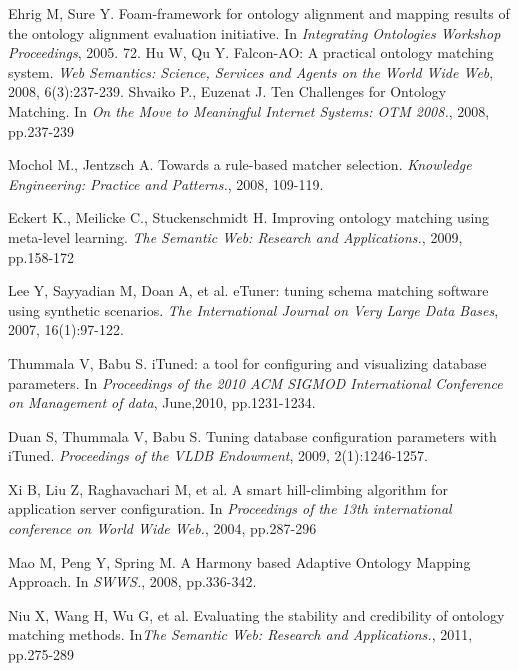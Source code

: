 \documentclass[twoside]{article}
\begin{document}
\begin{thebibliography}{99}
 Ehrig M, Sure Y. Foam-framework for ontology alignment and mapping results of the ontology alignment evaluation initiative. In {\it Integrating Ontologies Workshop Proceedings}, 2005. 72.
 Hu W, Qu Y. Falcon-AO: A practical ontology matching system. {\it Web Semantics: Science, Services and Agents on the World Wide Web}, 2008, 6(3):237-239.
Shvaiko P., Euzenat J. Ten Challenges for Ontology Matching. In {\it On the Move to Meaningful Internet Systems: OTM 2008.}, 2008, pp.237-239

Mochol M., Jentzsch A. Towards a rule-based matcher selection. {\it Knowledge Engineering: Practice and Patterns.}, 2008, 109-119.

Eckert K., Meilicke C., Stuckenschmidt H. Improving ontology matching using meta-level learning. {\it The Semantic Web: Research and Applications.}, 2009, pp.158-172

Lee Y, Sayyadian M, Doan A, et al. eTuner: tuning schema matching software using synthetic scenarios. {\it The International Journal on Very Large Data Bases}, 2007, 16(1):97-122.

Thummala V, Babu S. iTuned: a tool for configuring and visualizing database parameters. In {\it Proceedings of the 2010 ACM SIGMOD International Conference on Management of data}, June,2010, pp.1231-1234.

Duan S, Thummala V, Babu S. Tuning database configuration parameters with iTuned. {\it Proceedings of the VLDB Endowment}, 2009, 2(1):1246-1257.

Xi B, Liu Z, Raghavachari M, et al. A smart hill-climbing algorithm for application server configuration. In {\it Proceedings of the 13th international conference on World Wide Web.}, 2004, pp.287-296


Mao M, Peng Y, Spring M. A Harmony based Adaptive Ontology Mapping Approach. In {\it SWWS.}, 2008, pp.336-342.

Niu X, Wang H, Wu G, et al. Evaluating the stability and credibility of ontology matching methods. In{\it The Semantic Web: Research and Applications.}, 2011, pp.275-289


\end{thebibliography}
\end{document}

